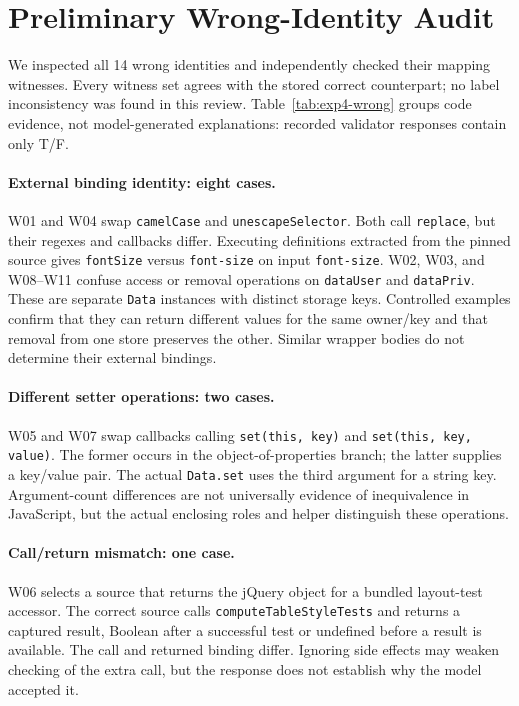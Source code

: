 \section{Preliminary Wrong-Identity Audit}
\label{sec:wrong-identities}

We inspected all 14 wrong identities and independently checked their mapping witnesses. Every witness set agrees with the stored correct counterpart; no label inconsistency was found in this review. Table~\ref{tab:exp4-wrong} groups code evidence, not model-generated explanations: recorded validator responses contain only T/F.

\paragraph{External binding identity: eight cases.}
W01 and W04 swap \texttt{camelCase} and \texttt{unescapeSelector}. Both call \texttt{replace}, but their regexes and callbacks differ. Executing definitions extracted from the pinned source gives \texttt{fontSize} versus \texttt{font-size} on input \texttt{font-size}. W02, W03, and W08--W11 confuse access or removal operations on \texttt{dataUser} and \texttt{dataPriv}. These are separate \texttt{Data} instances with distinct storage keys. Controlled examples confirm that they can return different values for the same owner/key and that removal from one store preserves the other. Similar wrapper bodies do not determine their external bindings.

\paragraph{Different setter operations: two cases.}
W05 and W07 swap callbacks calling \texttt{set(this, key)} and \texttt{set(this, key, value)}. The former occurs in the object-of-properties branch; the latter supplies a key/value pair. The actual \texttt{Data.set} uses the third argument for a string key. Argument-count differences are not universally evidence of inequivalence in JavaScript, but the actual enclosing roles and helper distinguish these operations.

\paragraph{Call/return mismatch: one case.}
W06 selects a source that returns the jQuery object for a bundled layout-test accessor. The correct source calls \texttt{computeTableStyleTests} and returns a captured result, Boolean after a successful test or undefined before a result is available. The call and returned binding differ. Ignoring side effects may weaken checking of the extra call, but the response does not establish why the model accepted it.

